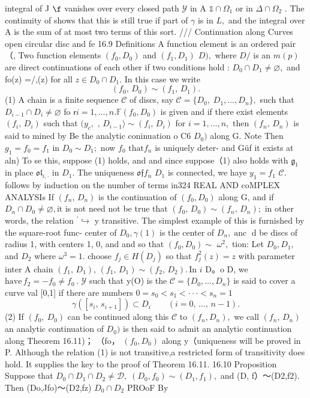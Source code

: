 integral of J $\boldsymbol{\f}$ vanishes over every closed path $\scriptstyle{\mathcal{Y}}$ in A $\mathbb{1}\cap\Omega_{1}$ or in $\Delta\cap\Omega_{2}$ . The continuity of shows that this is still true if part of $\gamma$ is in $L,$ and the integral over A is the sum of at most two terms of this sort. /// Continuation along Curves open circular disc and fe 16.9 Definitions A function element is an ordered pair （, Two function elements $(f_{0},D_{0})$ and $(f_{1},D_{1})$ $D),$ where $D\!\!\!\!/$ is an $m(p)$ are direct continuations of each other if two conditions hold : $D_{0}\cap D_{1}\neq\varnothing,$ and fo(z) =/,(z) for all $z\in D_{0}\cap D_{1}.$ In this case we write $$ (f_{0},\,D_{0})\sim(f_{1},\,D_{1}). $$ (1) A chain is a finite sequence $\mathcal{C}$ of discs, say ${\mathcal{C}}=\{D_{0},\;D_{1},\ldots,D_{n}\},$ such that $D_{i-1}\cap D_{i}\neq\varnothing$ fo ${\textsf{r}}i=1,\ldots,n.{\mathbb{F}}(f_{0},D_{0})$ is given and if there exist elements $(f_{i},\,D_{i})$ such that $\scriptstyle(y_{c},$ $,\,D_{i-1}\rangle\sim(f_{i},\,D_{i})$ for $i=1,\ldots,n,$ then $(f_{n},\,D_{n})$ is said to mined by Be the analytic coninuation o C6 $D_{0})$ along G. Note Then $g_{1}=f_{0}=f_{1}$ in $D_{0}\sim D_{1};$ now $f_{0}$ $\mathrm{that}f_{n}$ is uniquely deter- and Güf it exists at aln) To se this, suppose (1) holds, and and since suppose（1) also holds with ${\mathfrak{g}}_{1}$ in place $\mathfrak{o l}_{i,\cdot}$ in $D_{1}.$ The uniqueness ${\mathfrak{o f}}f_{n}$ $D_{1}$ is connected, we haye $y_{1}=f_{1}$ ${\mathcal{C}}.$ follows by induction on the number of terms in324 REAL AND coMPLEX ANALYSIs If $(f_{n},\,D_{n})$ is the continuation of $(f_{0},D_{0})$ along G, and if $D_{n}\cap D_{0}\neq\varnothing,{\mathrm{it}}$ is not need not be true that $(f_{0},\,D_{0})\sim(f_{n},\,D_{n});$ in other words, the relation ${}^{\prime}\hookrightarrow$ y transitive. The simplest example of this is furnished by the square-root func- center of $D_{0},\gamma(1)$ is the center of $D_{n},\operatorname{anc}$ d be discs of radius 1, with centers 1, 0, and and so that $(f_{0},D_{0})\sim$ $\omega^{2},$ tion: Let $D_{0},D_{1},$ and $D_{2}$ where $\omega^{3}=1.$ choose $f_{j}\in H(D_{j})$ so that $f_{j}^{2}(z)=z$ with parameter inter A chain $(f_{1},\,D_{1}),\,(f_{1},\,D_{1})\sim(f_{2},\,D_{2}).\,\mathrm{In}\,\,i$ D。o D, we $\mathrm{have}\,f_{2}=-f_{0}\neq f_{0}\,.$ $\scriptstyle{\mathcal{Y}}$ such that y(O) is the ${\mathcal{C}}=\{D_{0},\ldots,D_{n}\}$ is said to cover a curve val [0,1] if there are numbers $0=s_{0}<s_{1}<\cdot\cdot\cdot<s_{n}=1$ $$ \gamma(\left[s_{i},\,s_{i+1}\right])\subset D_{i}\qquad(i=0,\,\ldots,\,n-1). $$ (2) If $(f_{0},\ D_{0})$ can be continued along this $\textstyle{\mathcal{C}}$ to $(f_{n},D_{n}),$ we call $(f_{n},\,D_{n})$ an analytic continuation of $D_{0})$ is then said to admit an analytic continuation along Theorem 16.11)； （fo， $(f_{0},D_{0})$ along y（uniqueness will be proved in P. Although the relation (1) is not transitive,a restricted form of transitivity does hold. It supplies the key to the proof of Theorem 16.11. 16.10 Proposition Suppose that $D_{0}\cap D_{1}\cap D_{2}\neq{\mathcal{D}},\;(D_{0},f_{0})\sim(D_{1},f_{1}),$ and (D, f）～(D2,f2). Then (Do,Jfo)～(D2,fz) $D_{0}\cap D_{2}$ PROoF By 